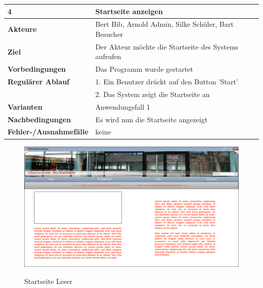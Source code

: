 \documentclass[fontsize=12pt,paper=a4,twoside]{scrartcl}
\begin{document}
\begin{table}[htbp]
\label{4}
\begin{tabular}{|l|p{10cm}|}
\hline 
\textbf{4} & \textbf{Startseite anzeigen} \\ \hline
\textbf{Akteure} & Bert Bib, Arnold Admin, Silke Schüler, Bart Besucher\\ \hline
\textbf{Ziel} & Der Akteur möchte die Startseite des Systems aufrufen  \\ \hline
\textbf{Vorbedingungen} & Das Programm wurde gestartet  \\ \hline
\textbf{Regulärer Ablauf} & 
1. Ein Benutzer drückt auf den Button 'Start' \\
&2. Das System zeigt die Startseite an\\
\hline
\textbf{Varianten} & 
Anwendungsfall 1 \\ \hline
\textbf{Nachbedingungen} & Es wird nun die Startseite angezeigt \\ \hline
\textbf{Fehler-/Ausnahmefälle} & keine\\
\hline
\end{tabular}
\end{table}

\begin{figure}[htbp]
\caption{Startseite Leser}
\includegraphics[width=1\textwidth]{ScreensWebsite/StartseiteLoggedInSchueler.png}
\label{Startseite Leser}
\end{figure}
\end{document}
